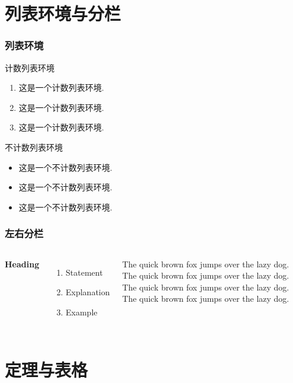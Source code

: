 \documentclass[notheorems,11pt]{beamer}
\theoremstyle{plain}
\numberwithin{theorem}{section}
\numberwithin{definition}{section}
\numberwithin{lemma}{section}
\numberwithin{proposition}{section}
\numberwithin{corollary}{section}
\theoremstyle{example}
\numberwithin{figure}{section}
\numberwithin{table}{section}
\numberwithin{equation}{section}
\begin{document}
\section{列表环境与分栏}

\begin{frame}
\frametitle{列表环境}

计数列表环境
\begin{enumerate}
\item 这是一个计数列表环境.
\item 这是一个计数列表环境.
\item 这是一个计数列表环境.
\end{enumerate}

\vspace{2ex}
不计数列表环境
\begin{itemize}[<+-| alert@+>]
\item 这是一个不计数列表环境.
\item 这是一个不计数列表环境.
\item 这是一个不计数列表环境.
\end{itemize}

\end{frame}


\begin{frame}
\frametitle{左右分栏}  %
\begin{columns}[t] %

\textbf{Heading}
\begin{enumerate}
\item Statement
\item Explanation
\item Example
\end{enumerate}

The quick brown fox jumps over the lazy dog. The quick brown fox jumps over the lazy dog. The quick brown fox jumps over the lazy dog. The quick brown fox jumps over the lazy dog.
\end{columns}
\end{frame}

\section{定理与表格}
\end{document}
